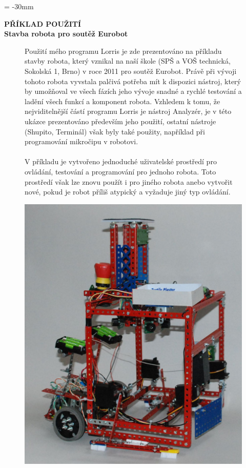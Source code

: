 \documentclass[17pt]{extreport}
\newcommand{\B}{\textbf} %
\begin{document}
\newpage
\voffset = -30mm %
\begin{center}
    \Large \B{PŘÍKLAD POUŽITÍ \\ Stavba robota pro soutěž Eurobot}
\end{center}
\vspace{5mm}
\enlargethispage{200mm} %
\begin{figure}[ht]
    \begin{minipage}[t]{0.48\linewidth}
Použití mého programu Lorris je zde prezentováno na příkladu stavby robota, který vznikal na naší škole (SPŠ a VOŠ technická, Sokolská 1, Brno) v roce 2011 pro soutěž Eurobot. Právě při vývoji tohoto robota vyvstala palčivá potřeba mít k dispozici nástroj, který by umožňoval ve všech fázích jeho vývoje snadné a rychlé testování a ladění všech funkcí a komponent robota. Vzhledem k tomu, že nejviditelnější částí programu Lorris je nástroj Analyzér, je v této ukázce prezentováno především jeho použití, ostatní nástroje (Shupito, Terminál) však byly také použity, například při programování mikročipu v robotovi.
\\ \\
V příkladu je vytvořeno jednoduché uživatelské prostředí pro ovládání, testování a programování pro jednoho robota. Toto prostředí však lze znovu použít i pro jiného robota anebo vytvořit nové, pokud je robot příliš atypický a vyžaduje jiný typ ovládání.
    \end{minipage}
    \hfill
    \begin{minipage}[t]{0.50\linewidth}
        \vspace{0pt}
        \includegraphics[width=\linewidth]{img/robot.jpg}
    \end{minipage}
\end{figure}\\
\end{document}
